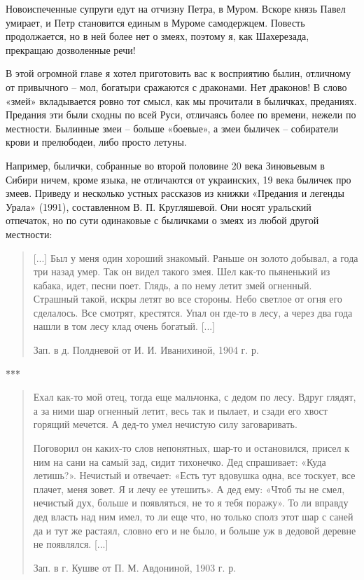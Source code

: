 Новоиспеченные супруги едут на отчизну Петра, в Муром. Вскоре князь Павел умирает, и Петр становится единым в Муроме самодержцем. Повесть продолжается, но в ней более нет о змеях, поэтому я, как Шахерезада, прекращаю дозволенные речи!

В этой огромной главе я хотел приготовить вас к восприятию былин, отличному от привычного – мол, богатыри сражаются с драконами. Нет драконов! В слово «змей» вкладывается ровно тот смысл, как мы прочитали в быличках, преданиях. Предания эти были сходны по всей Руси, отличаясь более по времени, нежели по местности. Былинные змеи – больше «боевые», а змеи быличек – собиратели крови и прелюбодеи, либо просто летуны.

Например, былички, собранные во второй половине 20 века Зиновьевым в Сибири\cite{zinoviev01} ничем, кроме языка, не отличаются от украинских, 19 века быличек про змеев. Приведу и несколько устных рассказов из книжки «Предания и легенды Урала» (1991), составленном В. П. Кругляшевой. Они носят уральский отпечаток, но по сути одинаковые с быличками о змеях из любой другой местности:

\begin{quotation}
[...] Был у меня один хороший знакомый. Раньше он золото добывал, а года три назад умер. Так он видел такого змея. Шел как-то пьяненький из кабака, идет, песни поет. Глядь, а по нему летит змей огненный. Страшный такой, искры летят во все стороны. Небо светлое от огня его сделалось. Все смотрят, крестятся. Упал он где-то в лесу, а через два года нашли в том лесу клад очень богатый. [...]

Зап. в д. Полдневой от И. И. Иванихиной, 1904 г. р.
\end{quotation}

\begin{center}
***\end{center}

\begin{quotation}
Ехал как-то мой отец, тогда еще мальчонка, с дедом по лесу. Вдруг глядят, а за ними шар огненный летит, весь так и пылает, и сзади его хвост горящий мечется. А дед-то умел нечистую силу заговаривать.

Поговорил он каких-то слов непонятных, шар-то и остановился, присел к ним на сани на самый зад, сидит тихонечко. Дед спрашивает: «Куда летишь?». Нечистый и отвечает: «Есть тут вдовушка одна, все тоскует, все плачет, меня зовет. Я и лечу ее утешить». А дед ему: «Чтоб ты не смел, нечистый дух, больше и появляться, не то я тебя поражу». То ли вправду дед власть над ним имел, то ли еще что, но только сполз этот шар с саней да и тут же растаял, словно его и не было, и больше уж в дедовой деревне не появлялся. [...]

Зап. в г. Кушве от П. М. Авдониной, 1903 г. р.
\end{quotation}

